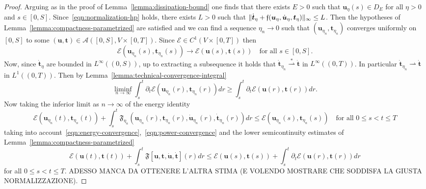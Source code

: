 \documentclass[letterpaper,oneside]{amsart}
\numberwithin{equation}{section}
\theoremstyle{definition}
\DeclarePairedDelimiter{\norm}{\lVert}{\rVert}
\begin{document}
\begin{proof}
Arguing as in the proof of Lemma~\ref{lemma:dissipation-bound} one finds that there exists $E>0$ such that $\boldsymbol{u}_\eta(s)\in D_E$ for all $\eta>0$ and $s\in[0,S]$. Since~\eqref{eqn:normalization-hp} holds, there exists $L>0$ such that $\norm{\dot{\boldsymbol{t}}_\eta+\mathfrak{f}(\boldsymbol{u}_\eta,\dot{\boldsymbol{u}}_\eta,\boldsymbol{t}_\eta)}_\infty\le L$. Then the hypotheses of Lemma~\ref{lemma:compactness-parametrized} are satisfied and we can find a sequence $\eta_n\to0$ such that $(\boldsymbol{u}_{\eta_n},\boldsymbol{t}_{\eta_n})$ converges uniformly on $[0,S]$ to some $(\boldsymbol{u},\boldsymbol{t})\in\mathscr{A}([0,S],V\times[0,T])$. Since $\mathcal{E}\in C^1(V\times[0,T])$ then
\begin{equation}
\label{eqn:energy-convergence}
\mathcal{E}(\boldsymbol{u}_{\eta_n}(s),\boldsymbol{t}_{\eta_n}(s))\to\mathcal{E}(\boldsymbol{u}(s),\boldsymbol{t}(s))\quad\text{for all $s\in[0,S]$}.
\end{equation}
Now, since $\dot{\boldsymbol{t}}_\eta$ are bounded in $L^\infty((0,S))$, up to extracting a subsequence it holds that $\dot{\boldsymbol{t}}_{\eta_n}\overset{*}{\rightharpoonup}\dot{\boldsymbol{t}}$ in $L^\infty((0,T))$. In particular $\dot{\boldsymbol{t}}_{\eta_n}\rightharpoonup\dot{\boldsymbol{t}}$ in $L^1((0,T))$. Then by Lemma~\ref{lemma:technical-convergence-integral}
\begin{equation}
\label{eqn:power-convergence}
\liminf_{n\to\infty}\int_s^t\partial_t\mathcal{E}(\boldsymbol{u}_{\eta_n}(r),\boldsymbol{t}_{\eta_n}(r))dr\ge\int_s^t\partial_t\mathcal{E}(\boldsymbol{u}(r),\boldsymbol{t}(r))dr.
\end{equation}
Now taking the inferior limit as $n\to\infty$ of the energy identity
\[
\mathcal{E}(\boldsymbol{u}_{\eta_n}(t),\boldsymbol{t}_{\eta_n}(t))+\int_s^t\mathfrak{F}_{\eta_n}(\boldsymbol{u}_{\eta_n}(r),\boldsymbol{t}_{\eta_n}(r),\dot{\boldsymbol{u}}_{\eta_n}(r),\dot{\boldsymbol{t}}_{\eta_n}(r))dr\le\mathcal{E}(\boldsymbol{u}_{\eta_n}(s),\boldsymbol{t}_{\eta_n}(s))\quad\text{for all $0\le s<t\le T$}
\]
taking into account~\eqref{eqn:energy-convergence},~\eqref{eqn:power-convergence} and the lower semicontinuity estimates of Lemma~\ref{lemma:compactness-parametrized}
\[
\mathcal{E}(\boldsymbol{u}(t),\boldsymbol{t}(t))+\int_s^t\mathfrak{F}[\boldsymbol{u},\boldsymbol{t},\dot{\boldsymbol{u}},\dot{\boldsymbol{t}}](r)dr\le\mathcal{E}(\boldsymbol{u}(s),\boldsymbol{t}(s))+\int_s^t\partial_t\mathcal{E}(\boldsymbol{u}(r),\boldsymbol{t}(r))dr
\]
for all $0\le s<t\le T$. ADESSO MANCA DA OTTENERE L'ALTRA STIMA (E VOLENDO MOSTRARE CHE SODDISFA LA GIUSTA NORMALIZZAZIONE).
\end{proof}
\end{document}
